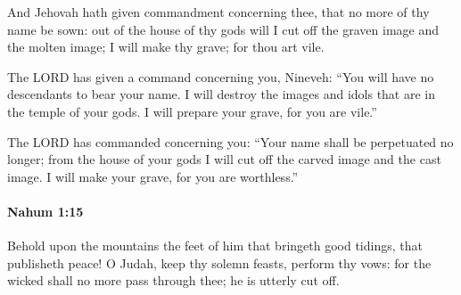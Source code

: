 			\begin{versebox}
					\item[BHS] 
					\item[LXX] 
					\item[ASV] And Jehovah hath given commandment concerning thee, that no more of thy name be sown: out of the house of thy gods will I cut off the graven image and the molten image; I will make thy grave; for thou art vile.
					\item[NIV] The LORD has given a command concerning you, Nineveh: “You will have no descendants to bear your name. I will destroy the images and idols that are in the temple of your gods. I will prepare your grave, for you are vile.”
					\item[NRSV] The LORD has commanded concerning you: “Your name shall be perpetuated no longer; from the house of your gods I will cut off the carved image and the cast image. I will make your grave, for you are worthless.”
			\end{versebox}

		\paragraph{Nahum 1:15} %
			\label{NAHUM-1-15}

			Behold upon the mountains the feet of him that bringeth good tidings, that publisheth peace! O Judah, keep thy solemn feasts, perform thy vows: for the wicked shall no more pass through thee; he is utterly cut off.

